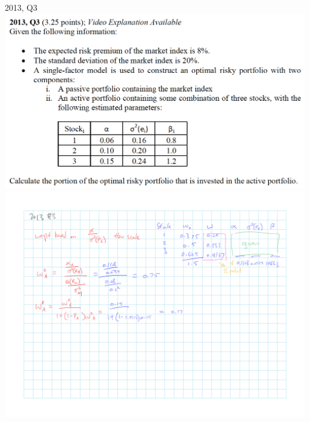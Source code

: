 \documentclass[]{book}
\theoremstyle{definition}
\theoremstyle{definition}
\theoremstyle{remark}
\begin{document}
 2013, Q3 \includegraphics{Section A/questions/2013-3Q.png}
\includegraphics{Section A/questions/2013-3A.png}
\end{document}
